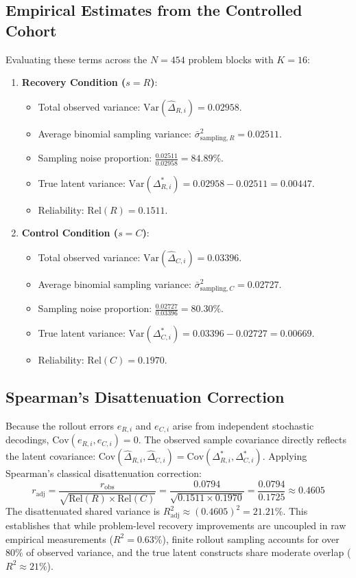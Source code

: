 \documentclass{article}
\begin{document}
\subsection{Empirical Estimates from the Controlled Cohort}
Evaluating these terms across the $N=454$ problem blocks with $K=16$:
\begin{enumerate}
    \item \textbf{Recovery Condition ($s = R$)}:
    \begin{itemize}
        \item Total observed variance: $\text{Var}(\hat{\Delta}_{R,i}) = 0.02958$.
        \item Average binomial sampling variance: $\bar{\sigma}^2_{\text{sampling},R} = 0.02511$.
        \item Sampling noise proportion: $\frac{0.02511}{0.02958} = \mathbf{84.89\%}$.
        \item True latent variance: $\text{Var}(\Delta_{R,i}^*) = 0.02958 - 0.02511 = 0.00447$.
        \item Reliability: $\text{Rel}(R) = \mathbf{0.1511}$.
    \end{itemize}
    \item \textbf{Control Condition ($s = C$)}:
    \begin{itemize}
        \item Total observed variance: $\text{Var}(\hat{\Delta}_{C,i}) = 0.03396$.
        \item Average binomial sampling variance: $\bar{\sigma}^2_{\text{sampling},C} = 0.02727$.
        \item Sampling noise proportion: $\frac{0.02727}{0.03396} = \mathbf{80.30\%}$.
        \item True latent variance: $\text{Var}(\Delta_{C,i}^*) = 0.03396 - 0.02727 = 0.00669$.
        \item Reliability: $\text{Rel}(C) = \mathbf{0.1970}$.
    \end{itemize}
\end{enumerate}

\subsection{Spearman's Disattenuation Correction}
Because the rollout errors $e_{R,i}$ and $e_{C,i}$ arise from independent stochastic decodings, $\text{Cov}(e_{R,i}, e_{C,i}) = 0$. The observed sample covariance directly reflects the latent covariance: $\text{Cov}(\hat{\Delta}_{R,i}, \hat{\Delta}_{C,i}) = \text{Cov}(\Delta_{R,i}^*, \Delta_{C,i}^*)$.
Applying Spearman's classical disattenuation correction:
\begin{equation}
r_{\text{adj}} = \frac{r_{\text{obs}}}{\sqrt{\text{Rel}(R) \times \text{Rel}(C)}} = \frac{0.0794}{\sqrt{0.1511 \times 0.1970}} = \frac{0.0794}{0.1725} \approx \mathbf{0.4605}
\end{equation}
The disattenuated shared variance is $R^2_{\text{adj}} \approx (0.4605)^2 = \mathbf{21.21\%}$.
This establishes that while problem-level recovery improvements are uncoupled in raw empirical measurements ($R^2 = 0.63\%$), finite rollout sampling accounts for over $80\%$ of observed variance, and the true latent constructs share moderate overlap ($R^2 \approx 21\%$).
\end{document}
